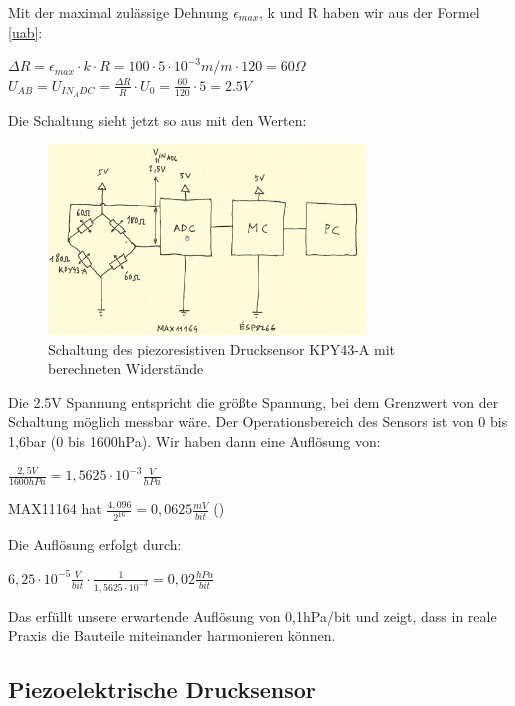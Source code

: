 \documentclass[12pt]{article}
\begin{document}
Mit der maximal zulässige Dehnung $\epsilon_{max}$, k und R haben wir aus der Formel \ref{uab}: 

\begin{center}
$\Delta R = \epsilon_{max} \cdot k \cdot R = 100 \cdot 5 \cdot 10^{-3} m/m \cdot 120 = 60 \Omega$ 
$U_{AB} = U_{IN_ADC} = \frac{\Delta R}{R} \cdot U_0 = \frac{60}{120} \cdot 5 = 2.5V$
\end{center}

Die Schaltung sieht jetzt so aus mit den Werten: 
\begin{figure}[h!]
  \centering
  \includegraphics[width=0.75\textwidth]{schaltungpiezoresistivmitwert}
  \caption{Schaltung des piezoresistiven Drucksensor KPY43-A mit berechneten Widerstände}
\end{figure}

Die 2.5V Spannung entspricht die größte Spannung, bei dem Grenzwert von der Schaltung möglich messbar wäre. Der Operationsbereich des Sensors ist von 0 bis 1,6bar (0 bis 1600hPa). Wir haben dann eine Auflösung von: 
\begin{center}
  $\frac{2,5V}{1600hPa} = 1,5625 \cdot 10^{-3} \frac{V}{hPa}$
\end{center}

MAX11164 hat $\frac{4,096}{2^{16}} = 0,0625 \frac{mV}{bit}$ (\cite{MaximIntegratedProducts.2015})

Die Auflösung erfolgt durch: 
\begin{center}
  $6,25 \cdot 10^{-5} \frac{V}{bit} \cdot \frac{1}{1,5625 \cdot 10^{-3}} = 0,02 \frac{hPa}{bit}$
\end{center}

Das erfüllt unsere erwartende Auflösung von 0,1hPa/bit und zeigt, dass in reale Praxis die Bauteile miteinander harmonieren können.

\newpage
\subsection{Piezoelektrische Drucksensor}
\end{document}
